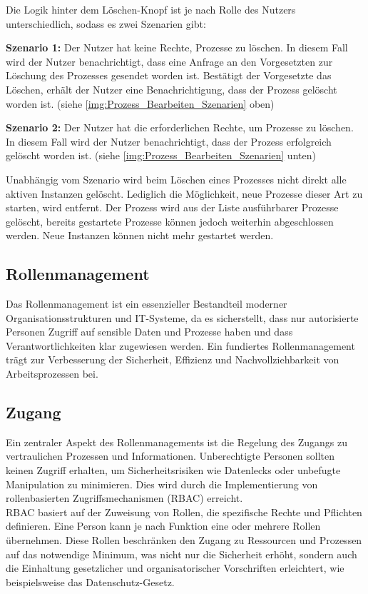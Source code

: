 Die Logik hinter dem Löschen-Knopf ist je nach Rolle des Nutzers unterschiedlich, sodass es zwei Szenarien gibt:

\textbf{Szenario 1:} Der Nutzer hat keine Rechte, Prozesse zu löschen.
In diesem Fall wird der Nutzer benachrichtigt, dass eine Anfrage an den Vorgesetzten zur Löschung des Prozesses gesendet worden ist. Bestätigt der Vorgesetzte das Löschen, erhält der Nutzer eine Benachrichtigung, dass der Prozess gelöscht worden ist. (siehe \autoref{img:Prozess_Bearbeiten_Szenarien} oben)

\textbf{Szenario 2:} Der Nutzer hat die erforderlichen Rechte, um Prozesse zu löschen.
In diesem Fall wird der Nutzer benachrichtigt, dass der Prozess erfolgreich gelöscht worden ist. (siehe \autoref{img:Prozess_Bearbeiten_Szenarien} unten)

Unabhängig vom Szenario wird beim Löschen eines Prozesses nicht direkt alle aktiven Instanzen gelöscht. Lediglich die Möglichkeit, neue Prozesse dieser Art zu starten, wird entfernt. Der Prozess wird aus der Liste ausführbarer Prozesse gelöscht, bereits gestartete Prozesse können jedoch weiterhin abgeschlossen werden. Neue Instanzen können nicht mehr gestartet werden.


\newpage


\subsection{Rollenmanagement} \label{Rollenmanagement}
Das Rollenmanagement ist ein essenzieller Bestandteil moderner Organisationsstrukturen und \ac{IT}-Systeme, da es sicherstellt, dass nur autorisierte Personen Zugriff auf sensible Daten und Prozesse haben und dass Verantwortlichkeiten klar zugewiesen werden. Ein fundiertes Rollenmanagement trägt zur Verbesserung der Sicherheit, Effizienz und Nachvollziehbarkeit von Arbeitsprozessen bei.

\subsection*{Zugang}
Ein zentraler Aspekt des Rollenmanagements ist die Regelung des Zugangs zu vertraulichen Prozessen und Informationen. Unberechtigte Personen sollten keinen Zugriff erhalten, um Sicherheitsrisiken wie Datenlecks oder unbefugte Manipulation zu minimieren. Dies wird durch die Implementierung von rollenbasierten Zugriffsmechanismen (\acs{RBAC}) erreicht.\\
\ac{RBAC} basiert auf der Zuweisung von Rollen, die spezifische Rechte und Pflichten definieren. Eine Person kann je nach Funktion eine oder mehrere Rollen übernehmen. Diese Rollen beschränken den Zugang zu Ressourcen und Prozessen auf das notwendige Minimum, was nicht nur die Sicherheit erhöht, sondern auch die Einhaltung gesetzlicher und organisatorischer Vorschriften erleichtert, wie beispielsweise das Datenschutz-Gesetz.

